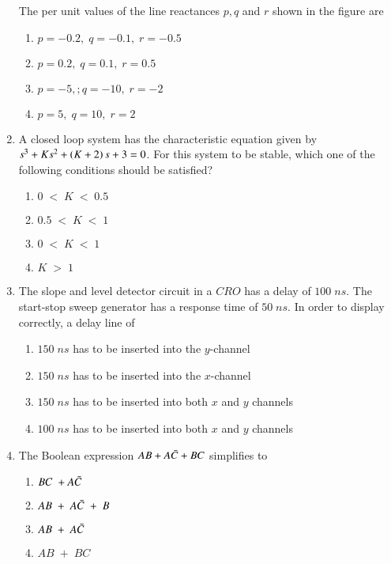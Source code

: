 \documentclass[journal,12pt,onecolumn]{IEEEtran}
\theoremstyle{remark}
\begin{document}
\begin{enumerate}

The per unit values of the line reactances $p,q$ and $r$ shown in the figure are
\begin{enumerate}
    \item $p=-0.2,\;q=-0.1,\;r=-0.5$
    \item $p=0.2,\;q=0.1,\;r=0.5$
    \item $p=-5,;q=-10,\;r=-2$
    \item $p=5,\;q=10,\;r=2$
\end{enumerate}
\item A closed loop system has the characteristic equation given by $s^3+Ks^2+\left(K+2\right)s+3=0$. For this system to be stable, which one of the following conditions should be satisfied?
\begin{enumerate}
    \item $0\;<\;K\;<\;0.5$
    \item $0.5\;<\;K\;<\;1$
    \item $0\;<\;K\;<\;1$
    \item $K\;>\;1$
\end{enumerate}
\item The slope and level detector circuit in a $CRO$ has a delay of $100\;ns$. The start-stop sweep generator has a response time of $50\;ns$. In order to display correctly, a delay line of 
\begin{enumerate}
    \item $150\;ns$ has to be inserted into the $y$-channel
    \item $150\;ns$ has to be inserted into the $x$-channel
    \item $150\;ns$ has to be inserted into both $x$ and $y$ channels
    \item $100\;ns$ has to be inserted into both $x$ and $y$ channels
\end{enumerate}
\item The Boolean expression $AB+A\Bar{C}+BC$ simplifies to 
\begin{enumerate}
    \item $BC\;+A\Bar{C}$
    \item $AB\;+\;A\Bar{C}\;+\;B$
    \item $AB\;+\;A\Bar{C}$
    \item $AB\;+\;BC$
\end{enumerate}

\end{enumerate}
\end{document}
